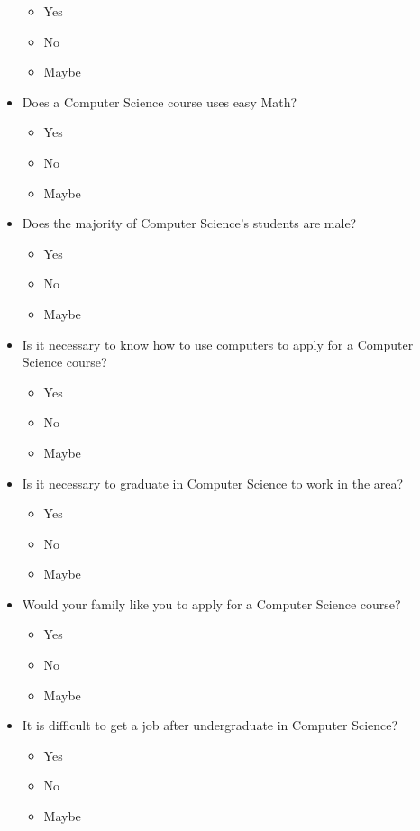 \begin{itemize}
		\begin{itemize}
			\item Yes
			\item No
			\item Maybe
		\end{itemize}
	\item Does a Computer Science course uses easy Math?
		\begin{itemize}
			\item Yes
			\item No
			\item Maybe
		\end{itemize}	
	\item Does the majority of Computer Science's students are male?
		\begin{itemize}
			\item Yes
			\item No
			\item Maybe
		\end{itemize}
	\item Is it necessary to know how to use computers to apply for a Computer Science course?
		\begin{itemize}
			\item Yes
			\item No
			\item Maybe
		\end{itemize}							
	\item Is it necessary to graduate in Computer Science to work in the area?
		\begin{itemize}
			\item Yes
			\item No
			\item Maybe
		\end{itemize}		
	\item Would your family like you to apply for a Computer Science course?
		\begin{itemize}
			\item Yes
			\item No
			\item Maybe
		\end{itemize}				
	\item It is difficult to get a job after undergraduate in Computer Science?
		\begin{itemize}
			\item Yes
			\item No
			\item Maybe
		\end{itemize}		

\end{itemize}
